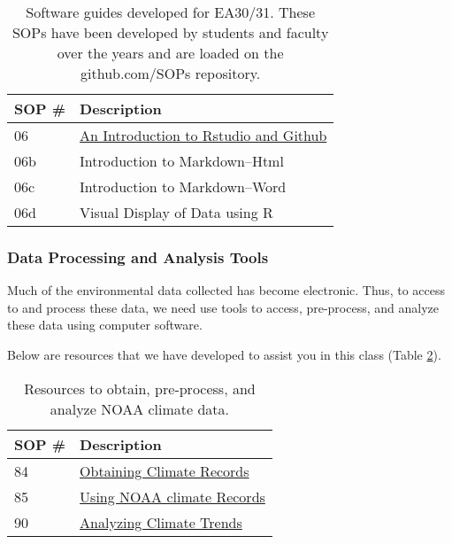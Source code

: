 \documentclass{article}\usepackage[]{graphicx}\usepackage[]{color}
\begin{document}
\begin{table}[h]
\caption{Software guides developed for EA30/31. These SOPs have been developed by students and faculty over the years and are loaded on the github.com/SOPs repository.}\label{tab:softwareguides}
\centering
\begin{tabular}{ll}\hline
SOP \#    & Description                                 \\\hline\hline
06        & \href{https://github.com/marclos/Climate_Change_Narratives/blob/master/Analysis_SOPs/SOP06_Rstudio_Server_Github.pdf}{An Introduction to Rstudio and Github} \\
06b       & Introduction to Markdown--Html  \\
06c       & Introduction to Markdown--Word  \\
06d       & Visual Display of Data using R  \\
\hline
\end{tabular}
\end{table}

\subsubsection{Data Processing and Analysis Tools}

Much of the environmental data collected has become electronic. Thus, to access to and process these data, we need use tools to access, pre-process, and analyze these data using computer software. 

Below are resources that we have developed to assist you in this class (Table \ref{tab:tools}).

\begin{table}[h]

\caption{Resources to obtain, pre-process, and analyze NOAA climate data.}\label{tab:tools}
\centering
\begin{tabular}{ll}\hline
SOP \#    & Description                                 \\\hline\hline
84        & \href{https://github.com/marclos/Climate_Change_Narratives/raw/master/Analysis_SOPs/SOP84_Obtaining_Climate_Records.pdf}{Obtaining Climate Records}\\
85        & \href{https://github.com/marclos/Climate_Change_Narratives/raw/master/Analysis_SOPs/SOP85_Using_NOAA_Climate_Records.pdf}{Using NOAA climate Records}\\
90        & \href{https://github.com/marclos/Climate_Change_Narratives/raw/master/Analysis_SOPs/SOP90_Analyzing_Trends.pdf}{Analyzing Climate Trends} \\ \hline
\end{tabular}
\end{table}
\end{document}
